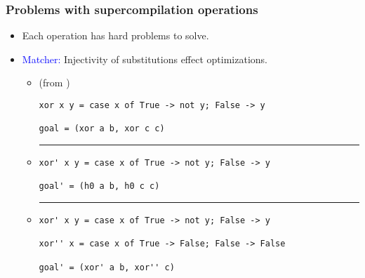 \documentclass{beamer}
\begin{document}
\begin{frame}[fragile]
    \frametitle{Problems with supercompilation operations}

    \begin{itemize}
        \item[]
            Each operation has hard problems to solve.

        \item[]
            \textcolor{blue}{Matcher:} Injectivity of substitutions effect
            optimizations.
            \begin{itemize}[<+(1)->]
                \item[]
                    (from \citet{callbyneed-sc})

                    \begin{verbatim}
xor x y = case x of True -> not y; False -> y

goal = (xor a b, xor c c)
                    \end{verbatim}

                \item[]
                    \centering\noindent\rule{4cm}{0.4pt}
                    \bigskip
                    \begin{verbatim}
xor' x y = case x of True -> not y; False -> y

goal' = (h0 a b, h0 c c)
                    \end{verbatim}

                \item[]
                    \centering\noindent\rule{4cm}{0.4pt}
                    \bigskip
                    \begin{verbatim}
xor' x y = case x of True -> not y; False -> y

xor'' x = case x of True -> False; False -> False

goal' = (xor' a b, xor'' c)
                    \end{verbatim}
            \end{itemize}
    \end{itemize}
\end{frame}
\end{document}
